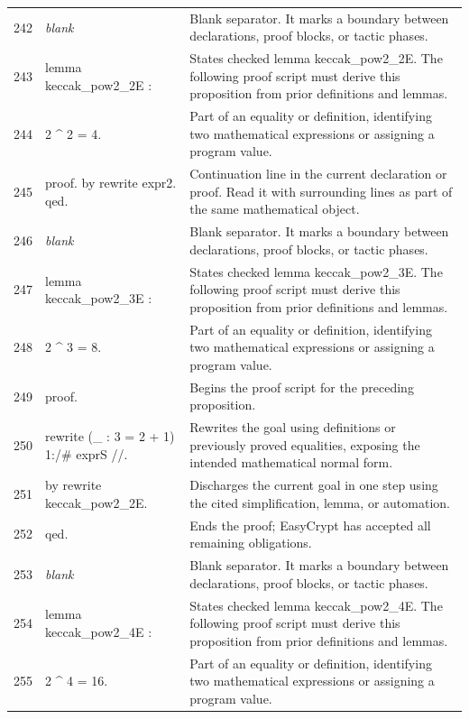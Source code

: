 \documentclass[10pt]{article}
\begin{document}
\begin{longtable}{r L{0.53\textwidth} L{0.37\textwidth}}
242 & {\ttfamily\scriptsize \emph{blank}} & Blank separator.  It marks a boundary between declarations, proof blocks, or tactic phases. \\
243 & {\ttfamily\scriptsize lemma keccak\_pow2\_2E :} & States checked lemma keccak\_pow2\_2E.  The following proof script must derive this proposition from prior definitions and lemmas. \\
244 & {\ttfamily\scriptsize   2 \textasciicircum{} 2 = 4.} & Part of an equality or definition, identifying two mathematical expressions or assigning a program value. \\
245 & {\ttfamily\scriptsize proof. by rewrite expr2. qed.} & Continuation line in the current declaration or proof.  Read it with surrounding lines as part of the same mathematical object. \\
246 & {\ttfamily\scriptsize \emph{blank}} & Blank separator.  It marks a boundary between declarations, proof blocks, or tactic phases. \\
247 & {\ttfamily\scriptsize lemma keccak\_pow2\_3E :} & States checked lemma keccak\_pow2\_3E.  The following proof script must derive this proposition from prior definitions and lemmas. \\
248 & {\ttfamily\scriptsize   2 \textasciicircum{} 3 = 8.} & Part of an equality or definition, identifying two mathematical expressions or assigning a program value. \\
249 & {\ttfamily\scriptsize proof.} & Begins the proof script for the preceding proposition. \\
250 & {\ttfamily\scriptsize rewrite (\_ : 3 = 2 + 1) 1:/\# exprS //.} & Rewrites the goal using definitions or previously proved equalities, exposing the intended mathematical normal form. \\
251 & {\ttfamily\scriptsize by rewrite keccak\_pow2\_2E.} & Discharges the current goal in one step using the cited simplification, lemma, or automation. \\
252 & {\ttfamily\scriptsize qed.} & Ends the proof; EasyCrypt has accepted all remaining obligations. \\
253 & {\ttfamily\scriptsize \emph{blank}} & Blank separator.  It marks a boundary between declarations, proof blocks, or tactic phases. \\
254 & {\ttfamily\scriptsize lemma keccak\_pow2\_4E :} & States checked lemma keccak\_pow2\_4E.  The following proof script must derive this proposition from prior definitions and lemmas. \\
255 & {\ttfamily\scriptsize   2 \textasciicircum{} 4 = 16.} & Part of an equality or definition, identifying two mathematical expressions or assigning a program value. \\

\end{longtable}
\end{document}
